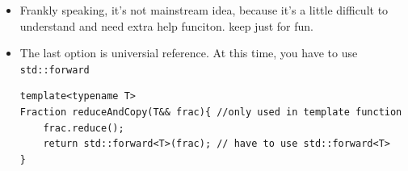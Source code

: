 \documentclass[a4paper,11pt,twoside]{book}
\begin{document}
\begin{itemize}
    \item Frankly speaking, it's not mainstream idea, because it's a little difficult to understand and need extra help funciton. keep just for fun.







    \item The last option is universial reference. At this time, you have to use \texttt{std::forward} 
\begin{lstlisting}[]
template<typename T>
Fraction reduceAndCopy(T&& frac){ //only used in template function 
	frac.reduce();
	return std::forward<T>(frac); // have to use std::forward<T>
} 
\end{lstlisting}

\end{itemize}
\end{document}
